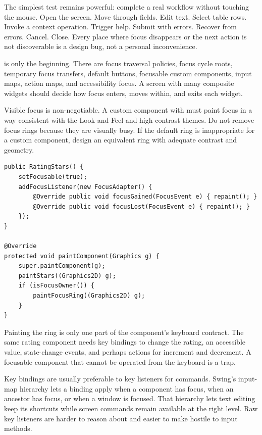 The simplest test remains powerful: complete a real workflow without touching the mouse. Open the screen. Move through fields. Edit text. Select table rows. Invoke a context operation. Trigger help. Submit with errors. Recover from errors. Cancel. Close. Every place where focus disappears or the next action is not discoverable is a design bug, not a personal inconvenience.

 is only the beginning. There are focus traversal policies, focus cycle roots, temporary focus transfers, default buttons, focusable custom components, input maps, action maps, and accessibility focus. A screen with many composite widgets should decide how focus enters, moves within, and exits each widget.

Visible focus is non-negotiable. A custom component with  must paint focus in a way consistent with the Look-and-Feel and high-contrast themes. Do not remove focus rings because they are visually busy. If the default ring is inappropriate for a custom component, design an equivalent ring with adequate contrast and geometry.

\begin{lstlisting}[caption={A custom component that repaints on focus changes.}]
public RatingStars() {
    setFocusable(true);
    addFocusListener(new FocusAdapter() {
        @Override public void focusGained(FocusEvent e) { repaint(); }
        @Override public void focusLost(FocusEvent e) { repaint(); }
    });
}

@Override
protected void paintComponent(Graphics g) {
    super.paintComponent(g);
    paintStars((Graphics2D) g);
    if (isFocusOwner()) {
        paintFocusRing((Graphics2D) g);
    }
}
\end{lstlisting}

Painting the ring is only one part of the component's keyboard contract. The same rating component needs key bindings to change the rating, an accessible value, state-change events, and perhaps actions for increment and decrement. A focusable component that cannot be operated from the keyboard is a trap.

Key bindings are usually preferable to key listeners for commands. Swing's input-map hierarchy lets a binding apply when a component has focus, when an ancestor has focus, or when a window is focused. That hierarchy lets text editing keep its shortcuts while screen commands remain available at the right level. Raw key listeners are harder to reason about and easier to make hostile to input methods.

